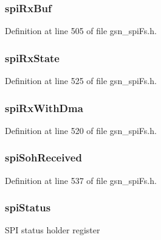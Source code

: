 \hypertarget{a00232_a7994f434c68cbf93b45175a28d5e5a17}{
\subsubsection[{spiRxBuf}]{ {\bf spiRxBuf}}}
\label{a00232_a7994f434c68cbf93b45175a28d5e5a17}


Definition at line 505 of file gsn\_\-spiFs.h.

\hypertarget{a00232_adf3468dddde12d5649c0b3225e1b0eb0}{
\subsubsection[{spiRxState}]{ {\bf spiRxState}}}
\label{a00232_adf3468dddde12d5649c0b3225e1b0eb0}


Definition at line 525 of file gsn\_\-spiFs.h.

\hypertarget{a00232_a916c13efb27c773a6adcc6129fb9be8e}{
\subsubsection[{spiRxWithDma}]{ {\bf spiRxWithDma}}}
\label{a00232_a916c13efb27c773a6adcc6129fb9be8e}


Definition at line 520 of file gsn\_\-spiFs.h.

\hypertarget{a00232_a270e63329b400ca8c48bbbd00754c318}{
\subsubsection[{spiSohReceived}]{ {\bf spiSohReceived}}}
\label{a00232_a270e63329b400ca8c48bbbd00754c318}


Definition at line 537 of file gsn\_\-spiFs.h.

\hypertarget{a00232_a8d5ce5c67020a6ef8da05f58f4593c0e}{
\subsubsection[{spiStatus}]{ {\bf spiStatus}}}
\label{a00232_a8d5ce5c67020a6ef8da05f58f4593c0e}
SPI status holder register 

